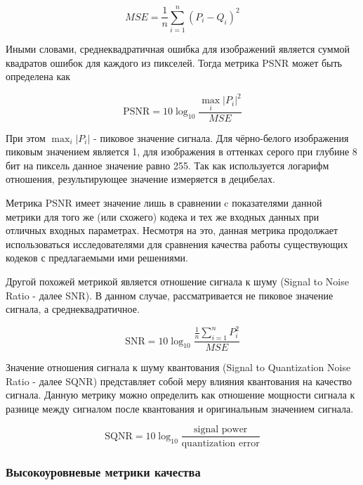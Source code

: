 \begin{equation} \label{eq:img_mse}
    MSE = \frac{1}{n} \sum_{i=1}^{n}\left(P_{i} - Q_{i}\right)^2
\end{equation}

Иными словами, среднеквадратичная ошибка для изображений является суммой
квадратов ошибок для каждого из пикселей. Тогда метрика PSNR может быть
определена как

\begin{equation} \label{eq:img_psnr}
    \text{PSNR} = 10\log_{10} \frac{\max_{i}\left|P_{i}\right|^{2}}{MSE}
\end{equation}

При этом $\max_{i}\left|P_{i}\right|$ - пиковое значение сигнала. Для
чёрно-белого изображения пиковым значением является 1, для изображения в
оттенках серого при глубине 8 бит на пиксель данное значение равно 255. Так как
используется логарифм отношения, результирующее значение измеряется в децибелах.

Метрика PSNR имеет значение лишь в сравнении c показателями данной метрики для
того же (или схожего) кодека и тех же входных данных при отличных входных
параметрах\cite{HuynhThu2008}. Несмотря на это, данная метрика продолжает
использоваться исследователями для сравнения качества работы существующих
кодеков с предлагаемыми ими решениями\cite{NetflixVMAFMedium}.

Другой похожей метрикой является отношение сигнала к шуму (Signal to Noise Ratio
- далее SNR). В данном случае, рассматривается не пиковое значение сигнала, а
среднеквадратичное.

\begin{equation} \label{eq:img_snr}
    \text{SNR} = 10\log_{10} \frac{\frac{1}{n}\sum_{i=1}^{n} P_{i}^{2}}{MSE}
\end{equation}

Значение отношения сигнала к шуму квантования (Signal to Quantization Noise
Ratio - далее SQNR) представляет собой меру влияния квантования на качество
сигнала. Данную метрику можно определить как отношение мощности сигнала к
разнице между сигналом после квантования и оригинальным значением сигнала.

\begin{equation} \label{eq:img_sqnr}
    \text{SQNR} = 10\log_{10} \frac{\text{signal power}}{\text{quantization error}}
\end{equation}

\subsubsection{Высокоуровневые метрики качества}

